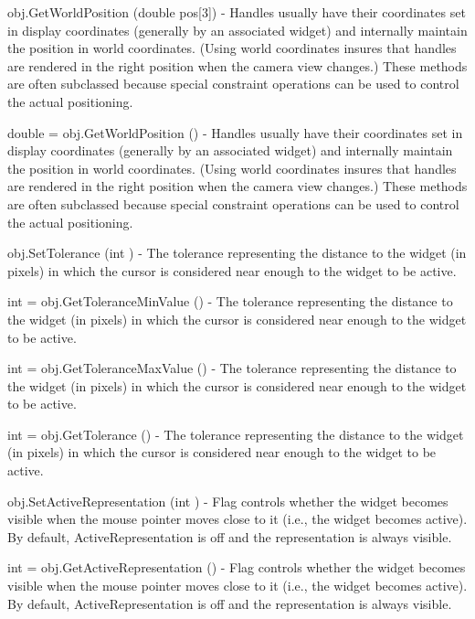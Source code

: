 \begin{DoxyItemize}
\item {\ttfamily obj.\-Get\-World\-Position (double pos\mbox{[}3\mbox{]})} -\/ Handles usually have their coordinates set in display coordinates (generally by an associated widget) and internally maintain the position in world coordinates. (Using world coordinates insures that handles are rendered in the right position when the camera view changes.) These methods are often subclassed because special constraint operations can be used to control the actual positioning.  
\item {\ttfamily double = obj.\-Get\-World\-Position ()} -\/ Handles usually have their coordinates set in display coordinates (generally by an associated widget) and internally maintain the position in world coordinates. (Using world coordinates insures that handles are rendered in the right position when the camera view changes.) These methods are often subclassed because special constraint operations can be used to control the actual positioning.  
\item {\ttfamily obj.\-Set\-Tolerance (int )} -\/ The tolerance representing the distance to the widget (in pixels) in which the cursor is considered near enough to the widget to be active.  
\item {\ttfamily int = obj.\-Get\-Tolerance\-Min\-Value ()} -\/ The tolerance representing the distance to the widget (in pixels) in which the cursor is considered near enough to the widget to be active.  
\item {\ttfamily int = obj.\-Get\-Tolerance\-Max\-Value ()} -\/ The tolerance representing the distance to the widget (in pixels) in which the cursor is considered near enough to the widget to be active.  
\item {\ttfamily int = obj.\-Get\-Tolerance ()} -\/ The tolerance representing the distance to the widget (in pixels) in which the cursor is considered near enough to the widget to be active.  
\item {\ttfamily obj.\-Set\-Active\-Representation (int )} -\/ Flag controls whether the widget becomes visible when the mouse pointer moves close to it (i.\-e., the widget becomes active). By default, Active\-Representation is off and the representation is always visible.  
\item {\ttfamily int = obj.\-Get\-Active\-Representation ()} -\/ Flag controls whether the widget becomes visible when the mouse pointer moves close to it (i.\-e., the widget becomes active). By default, Active\-Representation is off and the representation is always visible.  

\end{DoxyItemize}

